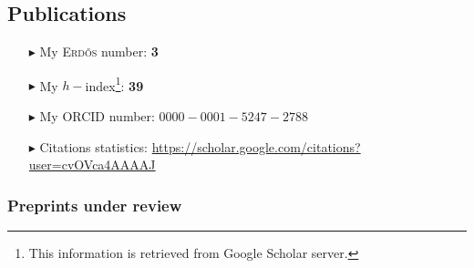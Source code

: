 \separator
\subsection{Publications}

\begin{itemize}
  \item[$\blacktriangleright$] My \textsc{Erd\H{o}s} number: \textbf{3}
  \item[$\blacktriangleright$] My $h-$index\footnote{This information is retrieved from Google Scholar server.}: \textbf{39}
  \item[$\blacktriangleright$] My ORCID number: $0000-0001-5247-2788$
  \item[$\blacktriangleright$] Citations statistics: \url{https://scholar.google.com/citations?user=cvOVca4AAAAJ}
\end{itemize}

\separator
\subsubsection{Preprints under review}

